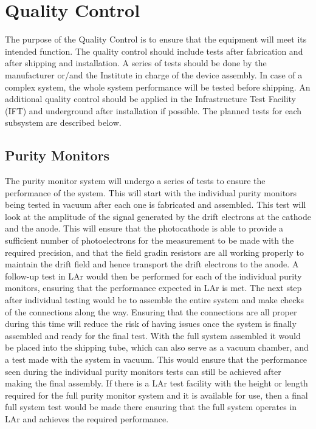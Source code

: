 \section{Quality Control}
\label{sec:fdsp-slow-cryo-qc}
The purpose of the Quality Control is to ensure that the equipment will meet its intended function. The quality control should include tests after fabrication and after shipping and installation. A series of tests should be done by the manufacturer or/and the Institute in charge of the device assembly. In case of a complex system, the whole system performance will be tested before shipping. 
An additional quality control should be applied in the Infrastructure Test Facility (IFT) and underground after installation if possible. The planned tests for each subsystem are described below.  


\subsection{Purity Monitors}
\label{sec:fdsp-slow-cryo-qc-pm}

The purity monitor system will undergo a series of tests to ensure the performance of the system.  This will start with the individual purity monitors being tested in vacuum after each one is fabricated and assembled.  This test will look at the amplitude of the signal generated by the drift electrons at the cathode and the anode.  This will ensure that the photocathode is able to provide a sufficient number of photoelectrons for the measurement to be made with the required precision, and that the field gradin resistors are all working properly to maintain the drift field and hence transport the drift electrons to the anode.  A follow-up test in LAr would then be performed for each of the individual purity monitors, ensuring that the performance expected in LAr is met.  The next step after individual testing would be to assemble the entire system and make checks of the connections along the way.  Ensuring that the connections are all proper during this time will reduce the risk of having issues once the system is finally assembled and ready for the final test.  With the full system assembled it would be placed into the shipping tube, which can also serve as a vacuum chamber, and a test made with the system in vacuum.  This would ensure that the performance seen during the individual purity monitors tests can still be achieved after making the final assembly.  If there is a LAr test facility with the height or length required for the full purity monitor system and it is available for use, then a final full system test would be made there ensuring that the full system operates in LAr and achieves the required performance.

